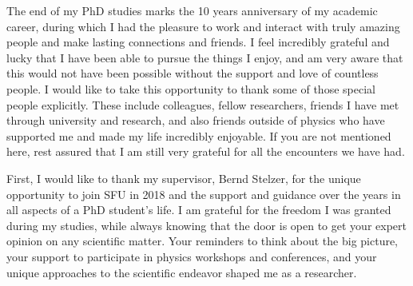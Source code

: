The end of my PhD studies marks the 10 years anniversary of my academic career, during which I had the pleasure to work and interact with truly amazing people and make lasting connections and friends.
I feel incredibly grateful and lucky that I have been able to pursue the things I enjoy, and am very aware that this would not have been possible without the support and love of countless people. 
I would like to take this opportunity to thank some of those special people explicitly.
These include colleagues, fellow researchers, friends I have met through university and research, and also friends outside of physics who have supported me and made my life incredibly enjoyable. 
If you are not mentioned here, rest assured that I am still very grateful for all the encounters we have had.

First, I would like to thank my supervisor, Bernd Stelzer, for the unique opportunity to join SFU in 2018 and the support and guidance over the years in all aspects of a PhD student's life. 
I am grateful for the freedom I was granted during my studies, while always knowing that the door is open to get your expert opinion on any scientific matter.
Your reminders to think about the big picture, your support to participate in physics workshops and conferences, and your unique approaches to the scientific endeavor shaped me as a researcher. 

